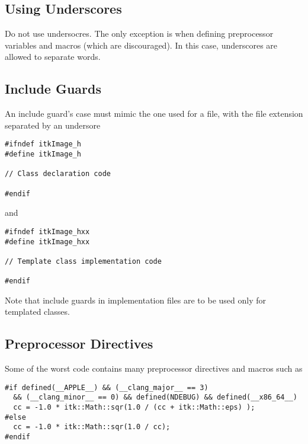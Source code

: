 \subsection{Using Underscores}
\label{subsec:UsingUnderscores}

Do not use undersocres. The only exception is when defining preprocessor
variables and macros (which are discouraged). In this case, underscores are
allowed to separate words.


\subsection{Include Guards}
\label{subsec:Include Guards}

An include guard's case must mimic the one used for a file, with the file
extension separated by an undersore

\small
\begin{verbatim}
#ifndef itkImage_h
#define itkImage_h

// Class declaration code

#endif
\end{verbatim}
\normalsize

and

\small
\begin{verbatim}
#ifndef itkImage_hxx
#define itkImage_hxx

// Template class implementation code

#endif
\end{verbatim}
\normalsize

Note that include guards in implementation files are to be used only for templated classes.


\subsection{Preprocessor Directives}
\label{subsec:PreprocessorDirectives}

Some of the worst code contains many preprocessor directives and macros such as

\small
\begin{verbatim}
#if defined(__APPLE__) && (__clang_major__ == 3)
  && (__clang_minor__ == 0) && defined(NDEBUG) && defined(__x86_64__)
  cc = -1.0 * itk::Math::sqr(1.0 / (cc + itk::Math::eps) );
#else
  cc = -1.0 * itk::Math::sqr(1.0 / cc);
#endif
\end{verbatim}
\normalsize

